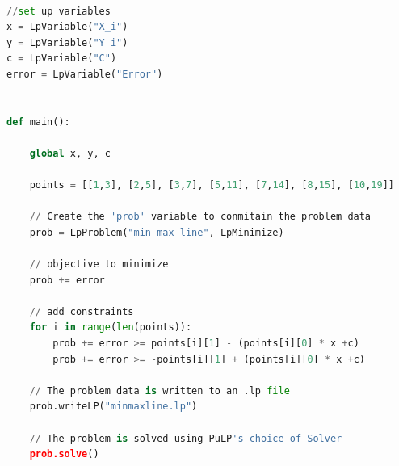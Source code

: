 \documentclass[11pt,letterpaper]{article}
\begin{document}
\begin{lstlisting}[language=python,caption={Code to solve linear program},mathescape]

//set up variables
x = LpVariable("X_i")
y = LpVariable("Y_i")
c = LpVariable("C")
error = LpVariable("Error")


def main():

	global x, y, c

	points = [[1,3], [2,5], [3,7], [5,11], [7,14], [8,15], [10,19]]

	// Create the 'prob' variable to conmitain the problem data
	prob = LpProblem("min max line", LpMinimize)

	// objective to minimize
	prob += error

	// add constraints
	for i in range(len(points)):
		prob += error >= points[i][1] - (points[i][0] * x +c)
		prob += error >= -points[i][1] + (points[i][0] * x +c)
	
	// The problem data is written to an .lp file
	prob.writeLP("minmaxline.lp")

	// The problem is solved using PuLP's choice of Solver
	prob.solve()
	

\end{lstlisting}
\end{document}
